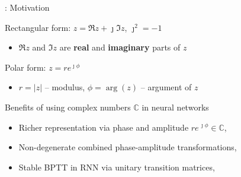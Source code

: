 \documentclass{beamer}
\newcommand{\cplx}{\mathbb{C}}
\newcommand{\iu}{{\jmath}}
\begin{document}
\begin{frame}[c]{\insertsection: Motivation}

  Rectangular form: $z = \Re{z} + \iu \Im{z}$, $\iu^2 = -1$
  \begin{itemize}
    \item $\Re{z}$ and $\Im{z}$ are \textbf{real} and \textbf{imaginary} parts of $z$
  \end{itemize}

  Polar form: $z = r e^{\iu \phi}$
  \begin{itemize}
    \item $r = \lvert z \rvert$ -- modulus, $\phi = \arg{\!(z)}$ -- argument of $z$
  \end{itemize}

  \bigskip
  Benefits of using complex numbers $\cplx$ in neural networks
  \begin{itemize}
    \item Richer representation via phase and amplitude $
        r e^{\,\iu \phi} \in \cplx
      $,
      {\tiny \\ \quad
        \citep{reichert_neuronal_2014}}
        \smallskip
    \item Non-degenerate combined phase-amplitude transformations,
      {\tiny \\ \quad
        \citep{hirose_generalization_2012}}
    \smallskip
    \item Stable BPTT in RNN via unitary transition matrices,
      {\tiny \\ \quad
        \citep{arjovsky_unitary_2016,wisdom_full-capacity_2016}}
  \end{itemize}

\end{frame}
\end{document}
